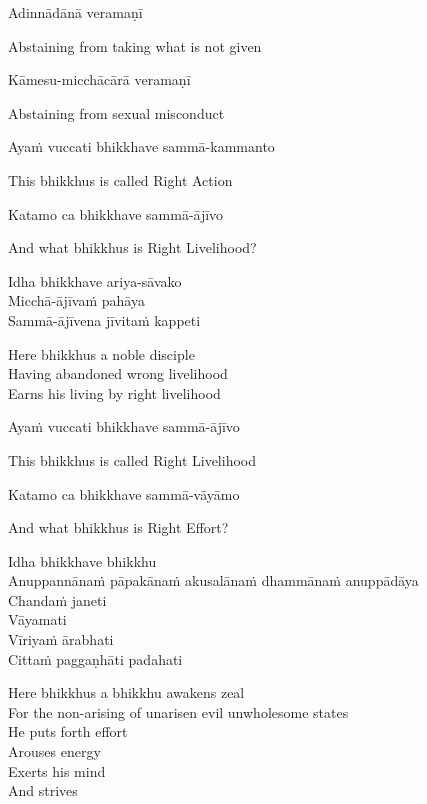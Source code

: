 Adinnādānā veramaṇī

\begin{cprenglish}
  Abstaining from taking what is not given
\end{cprenglish}

Kāmesu-micchācārā veramaṇī

\begin{cprenglish}
  Abstaining from sexual misconduct
\end{cprenglish}

Ayaṁ vuccati bhikkhave sammā-kammanto

\begin{cprenglish}
  This bhikkhus is called Right Action
\end{cprenglish}

Katamo ca bhikkhave sammā-ājīvo

\begin{cprenglish}
  And what bhikkhus is Right Livelihood?
\end{cprenglish}

Idha bhikkhave ariya-sāvako\\
Micchā-ājīvaṁ pahāya\\
Sammā-ājīvena jīvitaṁ kappeti

\begin{cprenglish}
  Here bhikkhus a noble disciple\\
  Having abandoned wrong livelihood\\
  Earns his living by right livelihood
\end{cprenglish}

Ayaṁ vuccati bhikkhave sammā-ājīvo

\begin{cprenglish}
  This bhikkhus is called Right Livelihood
\end{cprenglish}

Katamo ca bhikkhave sammā-vāyāmo

\begin{cprenglish}
  And what bhikkhus is Right Effort?
\end{cprenglish}

Idha bhikkhave bhikkhu\\
Anuppannānaṁ pāpakānaṁ akusalānaṁ dhammānaṁ anuppādāya\\
Chandaṁ janeti\\
Vāyamati\\
Vīriyaṁ ārabhati\\
Cittaṁ paggaṇhāti padahati

\begin{cprenglish}
  Here bhikkhus a bhikkhu awakens zeal\\
  For the non-arising of unarisen evil unwholesome states\\
  He puts forth effort\\
  Arouses energy\\
  Exerts his mind\\
  And strives
\end{cprenglish}


